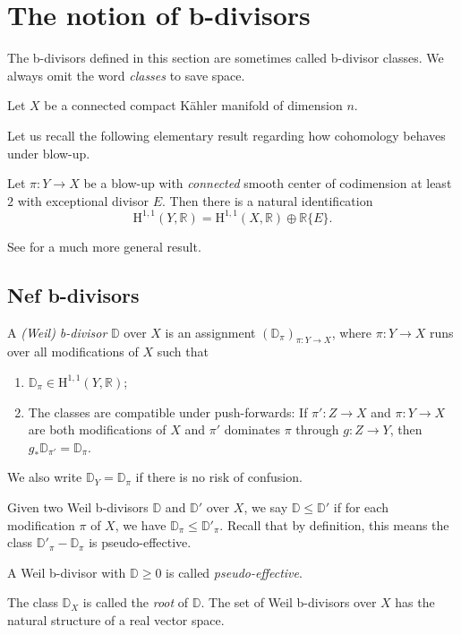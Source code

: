 \section{The notion of b-divisors}\label{sec:bdivnotion}

The b-divisors defined in this section are sometimes called b-divisor classes. We always omit the word \emph{classes} to save space.

Let $X$ be a connected compact Kähler manifold of dimension $n$.

Let us recall the following elementary result regarding how cohomology behaves under blow-up.
\begin{proposition}\label{prop:blowup_cone}
    Let $\pi\colon Y\rightarrow X$ be a blow-up with \emph{connected} smooth center of codimension at least $2$ with exceptional divisor $E$. Then there is a natural identification
    \begin{equation}\label{eq:H11blowup}
    \mathrm{H}^{1,1}(Y,\mathbb{R})=\mathrm{H}^{1,1}(X,\mathbb{R})\oplus \mathbb{R}\{E\}.
    \end{equation}
\end{proposition}
See \cite{RYY19} for a much more general result.


\subsection{Nef b-divisors}
\label{subsec:nefbdiv}
\begin{definition}\label{def:bdiv:L38}
    A \emph{(Weil) b-divisor} $\mathbb{D}$ over $X$ is an assignment $(\mathbb{D}_{\pi})_{\pi\colon Y\rightarrow X}$, where $\pi\colon Y\rightarrow X$ runs over all modifications of $X$ such that
    \begin{enumerate}
        \item\label{itm:chapter-bdiv:L43:1} $\mathbb{D}_{\pi}\in \mathrm{H}^{1,1}(Y,\mathbb{R})$;
        \item\label{itm:chapter-bdiv:L43:2} The classes are compatible under push-forwards: If $\pi'\colon Z\rightarrow X$ and $\pi\colon Y\rightarrow X$ are both modifications of $X$ and $\pi'$ dominates $\pi$ through $g\colon Z\rightarrow Y$, then $g_*\mathbb{D}_{\pi'}=\mathbb{D}_{\pi}$.
    \end{enumerate}
    We also write $\mathbb{D}_Y=\mathbb{D}_{\pi}$ if there is no risk of confusion.

    Given two Weil b-divisors $\mathbb{D}$ and $\mathbb{D}'$ over $X$, we say $\mathbb{D}\leq \mathbb{D}'$ if for each modification $\pi$ of $X$, we have $\mathbb{D}_{\pi}\leq \mathbb{D}'_{\pi}$. Recall that by definition, this means the class $\mathbb{D}'_{\pi}-\mathbb{D}_{\pi}$ is pseudo-effective.

    A Weil b-divisor with $\mathbb{D}\geq 0$ is called \emph{pseudo-effective}.
\end{definition}
The class $\mathbb{D}_X$ is called the \emph{root} of $\mathbb{D}$.
The set of Weil b-divisors over $X$ has the natural structure of a real vector space.


